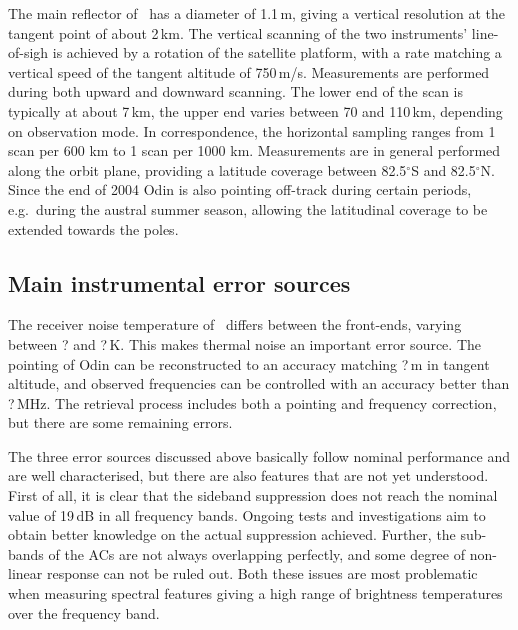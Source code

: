 The main reflector of \smr\ has a diameter of 1.1\,m, giving a
vertical resolution at the tangent point of about 2\,km. The vertical scanning
of the two instruments' line-of-sigh is achieved by a rotation of the satellite
platform, with a rate matching a vertical speed of the tangent altitude of
750\,m/s. Measurements are performed during both upward and downward scanning.
The lower end of the scan is typically at about 7\,km, the upper end varies
between 70 and 110\,km, depending on observation mode. In correspondence,
the horizontal sampling ranges from 1 scan per 600 km to 1 scan per 1000 km.
Measurements are in general performed along the orbit plane, providing a
latitude coverage between 82.5$^{\circ}$S and 82.5$^{\circ}$N. Since the end of
2004 Odin is also pointing off-track during certain periods, e.g.\ during the
austral summer season, allowing the latitudinal coverage to be extended towards
the poles. 


\subsection{Main instrumental error sources}
%
The receiver noise temperature of \smr\ differs between the front-ends, varying
between ? and ?\,K. This makes thermal noise an important
error source. The pointing of Odin can be reconstructed to an accuracy matching
?\,m in tangent altitude, and observed frequencies can be controlled with an
accuracy better than ?\,MHz. The retrieval process includes
both a pointing and frequency correction, but there are some remaining errors.

The three error sources discussed above basically follow nominal performance
and are well characterised, but there are also features that are not yet
understood. First of all, it is clear that the sideband suppression does not
reach the nominal value of 19\,dB in all frequency bands. Ongoing tests and
investigations aim to obtain better knowledge on the actual suppression achieved.
Further, the sub-bands of the ACs are not always overlapping perfectly, and
some degree of non-linear response can not be ruled out. Both these issues are
most problematic when measuring spectral features giving a high range of
brightness temperatures over the frequency band.

